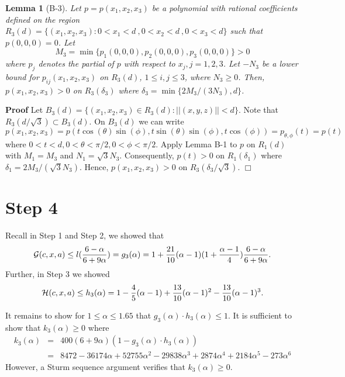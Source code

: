 \documentclass[12pt]{article}
\newtheorem{lemma}[theorem]{Lemma}
\begin{document}


\begin{lemma}[B-3] \label{lem:est3}
Let $p = p(x_1,x_2,x_3)$ be a polynomial with rational coefficients defined on the region $R_3(d) = \{ (x_1,x_2,x_3) : 0 < x_1 < d\ , 0 < x_2 < d\ ,0 < x_3 < d\}$ such that $p(0,0,0) = 0$.  
Let 
$$M_3 = \min\{p_1(0,0,0), p_2(0,0,0), p_3(0,0,0)\} > 0$$
where $p_j$ denotes the partial of $p$ with respect to $x_j, j = 1, 2, 3$.  
Let $-N_3$ be a lower bound for $p_{ij}(x_1,x_2,x_3)$ on $R_3(d)$, $ 1 \le i,j \le 3$,  where $N_3 \ge 0$.  Then,
$p(x_1,x_2,x_3) > 0$ on $R_3(\delta_3)$ where $\delta_3 = \min\{2 M_3/(3N_3),d\}$.
\end{lemma}
\textbf{Proof}
Let $B_3(d) = \{(x_1,x_2,x_3) \in R_3(d) : ||(x,y,z)|| < d\}$.  Note that $R_3(d/\sqrt{3}) \subset B_3(d)$.  On $B_3(d)$ we can write 
$$p(x_1,x_2,x_3) = p(t\cos(\theta)\sin(\phi),t\sin(\theta)\sin(\phi),t\cos(\phi)) = p_{\theta,\phi}(t) = p(t)$$ 
where $0 < t < d, 0 < \theta < \pi/2, 0 < \phi < \pi/2$.  Apply Lemma B-1 to $p$ on $R_1(d)$ with $M_1 = M_3$ and $N_1 = \sqrt{3}N_3$. Consequently, $p(t) > 0$ on $R_1(\delta_1)$ where $\delta_1 = 2M_3/(\sqrt{3} N_3)$.  Hence, $p(x_1,x_2,x_3) > 0$ on $R_3(\delta_3/\sqrt{3})$. $\Box$

\vspace{0.2in}

\section{Step 4}

Recall in Step 1 and Step 2, we showed that 
$$
{\cal G}(c,x,a) \le l(\frac{6-\alpha}{6+9\alpha}) = g_3(\alpha) =
1 + \frac{21}{10}(\alpha-1)(1 + \frac{\alpha-1}{4})\frac{6-\alpha}{6+9\alpha}.
$$
Further, in Step 3 we showed 
$$
{\cal H}(c,x,a) \le h_3(\alpha) =  1 - \frac{4}{5}(\alpha-1) + \frac{13}{10}(\alpha-1)^2 - \frac{13}{10}(\alpha-1)^3.
$$  

It remains to show for $1 \le \alpha \le 1.65$ that $g_3(\alpha)\cdot h_3(\alpha) \le 1$.  It is sufficient to show
that $k_3(\alpha) \ge 0$ where 
\begin{eqnarray*}
k_3(\alpha) &=& 400(6+9\alpha)(1-g_3(\alpha)\cdot h_3(\alpha)) \\
            &=& 8472-36174\alpha+52755\alpha^2-29838\alpha^3+2874\alpha^4+2184\alpha^5-273\alpha^6
\end{eqnarray*}
However, a Sturm sequence argument verifies that $k_3(\alpha) \ge 0$.
\end{document}
